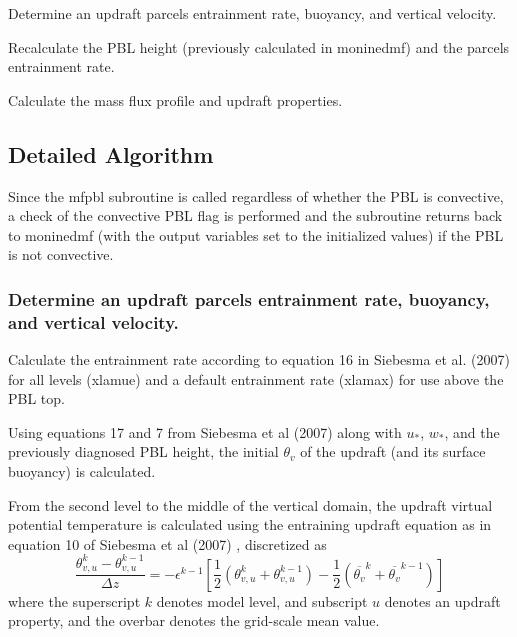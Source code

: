 \begin{DoxyEnumerate}
\item Determine an updraft parcel\textquotesingle{}s entrainment rate, buoyancy, and vertical velocity.
\item Recalculate the P\+BL height (previously calculated in moninedmf) and the parcel\textquotesingle{}s entrainment rate.
\item Calculate the mass flux profile and updraft properties. 
\end{DoxyEnumerate}\hypertarget{group___g_f_s___n_s_s_t_detailed}{}\subsection{Detailed Algorithm}\label{group___g_f_s___n_s_s_t_detailed}
Since the mfpbl subroutine is called regardless of whether the P\+BL is convective, a check of the convective P\+BL flag is performed and the subroutine returns back to moninedmf (with the output variables set to the initialized values) if the P\+BL is not convective.

\subsubsection*{Determine an updraft parcel\textquotesingle{}s entrainment rate, buoyancy, and vertical velocity.}

Calculate the entrainment rate according to equation 16 in Siebesma et al. (2007) \cite{siebesma_et_al_2007} for all levels (xlamue) and a default entrainment rate (xlamax) for use above the P\+BL top.

Using equations 17 and 7 from Siebesma et al (2007) \cite{siebesma_et_al_2007} along with $u_*$, $w_*$, and the previously diagnosed P\+BL height, the initial $\theta_v$ of the updraft (and its surface buoyancy) is calculated.

From the second level to the middle of the vertical domain, the updraft virtual potential temperature is calculated using the entraining updraft equation as in equation 10 of Siebesma et al (2007) \cite{siebesma_et_al_2007}, discretized as \[ \frac{\theta_{v,u}^k - \theta_{v,u}^{k-1}}{\Delta z}=-\epsilon^{k-1}\left[\frac{1}{2}\left(\theta_{v,u}^k + \theta_{v,u}^{k-1}\right)-\frac{1}{2}\left(\overline{\theta_{v}}^k + \overline{\theta_v}^{k-1}\right)\right] \] where the superscript $k$ denotes model level, and subscript $u$ denotes an updraft property, and the overbar denotes the grid-\/scale mean value.

